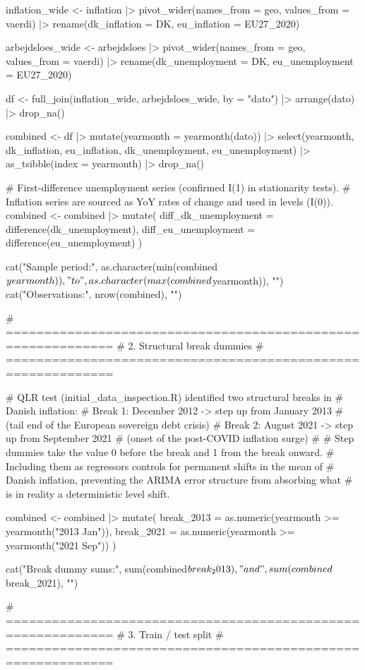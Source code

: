inflation_wide <- inflation |>
  pivot_wider(names_from = geo, values_from = vaerdi) |>
  rename(dk_inflation = DK, eu_inflation = EU27_2020)

arbejdsloes_wide <- arbejdsloes |>
  pivot_wider(names_from = geo, values_from = vaerdi) |>
  rename(dk_unemployment = DK, eu_unemployment = EU27_2020)

df <- full_join(inflation_wide, arbejdsloes_wide, by = "dato") |>
  arrange(dato) |>
  drop_na()

combined <- df |>
  mutate(yearmonth = yearmonth(dato)) |>
  select(yearmonth, dk_inflation, eu_inflation, dk_unemployment, eu_unemployment) |>
  as_tsibble(index = yearmonth) |>
  drop_na()

# First-difference unemployment series (confirmed I(1) in stationarity tests).
# Inflation series are sourced as YoY rates of change and used in levels (I(0)).
combined <- combined |>
  mutate(
    diff_dk_unemployment = difference(dk_unemployment),
    diff_eu_unemployment = difference(eu_unemployment)
  )

cat("Sample period:", as.character(min(combined$yearmonth)),
    "to", as.character(max(combined$yearmonth)), "\n")
cat("Observations:", nrow(combined), "\n")


# ============================================================
# 2. Structural break dummies
# ============================================================

# QLR test (initial_data_inspection.R) identified two structural breaks in
# Danish inflation:
#   Break 1: December 2012  ->  step up from January 2013
#            (tail end of the European sovereign debt crisis)
#   Break 2: August 2021    ->  step up from September 2021
#            (onset of the post-COVID inflation surge)
#
# Step dummies take the value 0 before the break and 1 from the break onward.
# Including them as regressors controls for permanent shifts in the mean of
# Danish inflation, preventing the ARIMA error structure from absorbing what
# is in reality a deterministic level shift.

combined <- combined |>
  mutate(
    break_2013 = as.numeric(yearmonth >= yearmonth("2013 Jan")),
    break_2021 = as.numeric(yearmonth >= yearmonth("2021 Sep"))
  )

cat("Break dummy sums:", sum(combined$break_2013), "and", sum(combined$break_2021), "\n")


# ============================================================
# 3. Train / test split
# ============================================================

